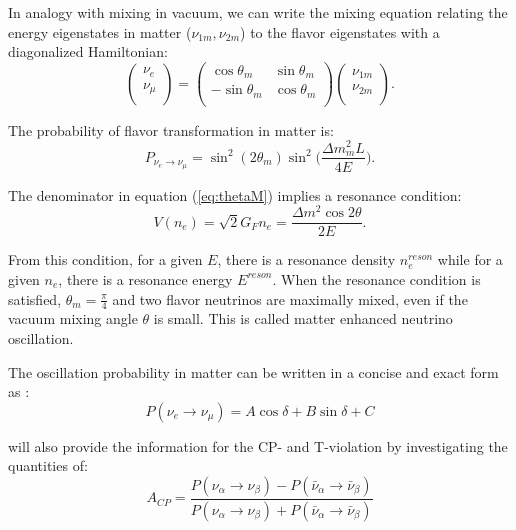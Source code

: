 In analogy with mixing in vacuum, we can write the mixing equation relating the energy eigenstates in matter ($\nu_{1m},\nu_{2m}$) to the flavor eigenstates with a diagonalized Hamiltonian:
\begin{equation}\label{eq:matter_mixing}
	\begin{pmatrix}
		\nu_e\\
		\nu_\mu\\
	\end{pmatrix}
	= \begin{pmatrix}
		\cos\theta_m & \sin\theta_m\\
		-\sin\theta_m & \cos\theta_m \\
	\end{pmatrix}
	\begin{pmatrix}
		\nu_{1m}\\
		\nu_{2m}\\
	\end{pmatrix}.
\end{equation}

The probability of flavor transformation in matter is:
\begin{equation}
	P_{\nu_e\to\nu_{\mu}}=\sin^2(2\theta_m)\sin^2\Big(\frac{\Delta m_m^2L}{4E}\Big).
\end{equation}

The denominator in equation (\ref{eq:thetaM}) implies a resonance condition:
\begin{equation}\label{eq:reson_condition}
	V(n_e)=\sqrt 2G_Fn_e=\frac{\Delta m^2\cos2\theta}{2E}.
\end{equation}

From this condition, for a given $E$, there is a resonance density $n^{reson}_e$ while for a given $n_e$, there is a resonance energy $E^{reson}$. When the resonance condition is satisfied, $\theta_m = \frac{\pi}{4}$ and two flavor neutrinos are maximally mixed, even if the vacuum mixing angle $\theta$ is small. This is called matter enhanced neutrino oscillation\cite{smirnov2016solar,fukugita2013physics}.

The oscillation probability in matter can be written in a concise and exact form as \cite{kimura2002exact}:
\[
P(\nu_e\to\nu_\mu) = A\cos\delta+B\sin\delta+C
\]

will also provide the information for the CP- and T-violation
by investigating the quantities of:
\[
A_{CP} = \frac{P(\nu_\alpha\to\nu_\beta)-P(\bar{\nu}_\alpha\to\bar{\nu}_\beta)}{P(\nu_\alpha\to\nu_\beta)+P(\bar{\nu}_\alpha\to\bar{\nu}_\beta)}
\]

